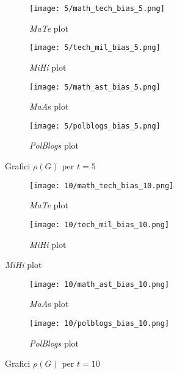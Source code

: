 \begin{figure}[!h]
    \centering
\begin{subfigure}[b]{0.4\textwidth}
    \centering
    \texttt{[image: 5/math\_tech\_bias\_5.png]}
    \caption{\emph{MaTe} plot}\label{fig:mate_b_5}
\end{subfigure}
\hspace{0.1\columnwidth}
\begin{subfigure}[b]{0.4\textwidth}
    \centering
    \texttt{[image: 5/tech\_mil\_bias\_5.png]}
    \caption{\emph{MiHi} plot}\label{fig:mihi_b_5}
\end{subfigure}

\begin{subfigure}[b]{0.4\textwidth}
    \centering
    \texttt{[image: 5/math\_ast\_bias\_5.png]}
    \caption{\emph{MaA}s plot}\label{fig:maas_b_5}
\end{subfigure}
\hspace{0.1\columnwidth}
\begin{subfigure}[b]{0.4\textwidth}
    \centering
    \texttt{[image: 5/polblogs\_bias\_5.png]}
    \caption{\emph{PolBlogs} plot}\label{fig:polblogs_b_5}
\end{subfigure}
\caption{Grafici $\rho(G)$ per $t=5$}
\end{figure}
\begin{figure}[!h]
    \centering
\begin{subfigure}[b]{0.4\textwidth}
    \centering
    \texttt{[image: 10/math\_tech\_bias\_10.png]}
    \caption{\emph{MaTe} plot}\label{fig:mate_b_10}
\end{subfigure}
\hspace{0.1\columnwidth}
\begin{subfigure}[b]{0.4\textwidth}
    \centering
    \texttt{[image: 10/tech\_mil\_bias\_10.png]}
    \caption{\emph{MiHi} plot}\label{fig:mihi_b_10}
\end{subfigure}
\end{figure}
\begin{figure}
    \ContinuedFloat
    \centering
\begin{subfigure}[b]{0.4\textwidth}
    \centering
    \texttt{[image: 10/math\_ast\_bias\_10.png]}
    \caption{\emph{MaA}s plot}\label{fig:maas_b_10}
\end{subfigure}
\hspace{0.1\columnwidth}
\begin{subfigure}[b]{0.4\textwidth}
    \centering
    \texttt{[image: 10/polblogs\_bias\_10.png]}
    \caption{\emph{PolBlogs} plot}\label{fig:polblogs_b_10}
\end{subfigure}
\caption{Grafici $\rho(G)$ per $t=10$}
\end{figure}
